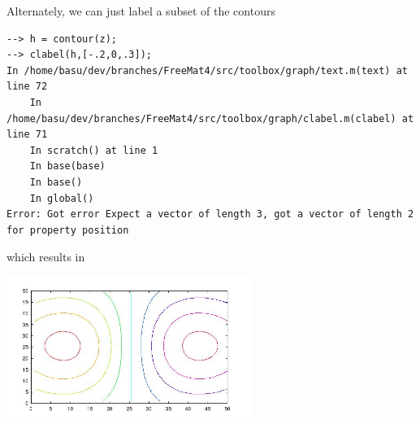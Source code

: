 Alternately, we can just label a subset of the contours
\begin{verbatim}
--> h = contour(z);
--> clabel(h,[-.2,0,.3]);
In /home/basu/dev/branches/FreeMat4/src/toolbox/graph/text.m(text) at line 72
    In /home/basu/dev/branches/FreeMat4/src/toolbox/graph/clabel.m(clabel) at line 71
    In scratch() at line 1
    In base(base)
    In base()
    In global()
Error: Got error Expect a vector of length 3, got a vector of length 2 for property position
\end{verbatim}
which results in


\centerline{\includegraphics[width=8cm]{clabel2}}

